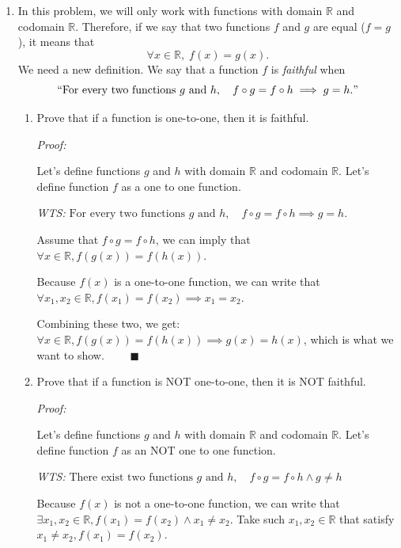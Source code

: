 \documentclass[12pt]{exam}
\newcommand{\vv}{\vspace{.1cm}}
\newcommand{\R}{\mathbb{R}}
\begin{document}
\begin{enumerate}

\item In this problem, we will only work with functions with domain $\mathbb{R}$ and codomain $\R$.   Therefore, if we say that two functions $f$ and $g$ are equal ($f=g$), it means that 
	$$
		\forall x \in \R, \; f(x)  = g(x) .
	$$
We need a new definition.  We say that a function $f$ is \emph{faithful} when
	\begin{equation*}
		``\mbox{For every two functions } g \mbox{ and } h, \quad f \circ g = f \circ h \implies g = h."
	\end{equation*}
	\begin{enumerate}
		\item  Prove that if a function is one-to-one, then it is faithful.
		
{
	\vv

	\emph{Proof:}

	\vv

	Let's define functions $g$ and $h$ with domain $\R$ and codomain $\R$. Let's define function $f$ as a one to one function.

	\emph{WTS:} $\mbox{For every two functions } g \mbox{ and } h, \quad f \circ g = f \circ h \implies g = h.$


	Assume that $f \circ g = f \circ h$, 
	we can imply that $\forall x \in \R, f(g(x)) = f(h(x)) $.

	Because $f(x)$ is a one-to-one function, we can write that $\forall x_1, x_2 \in \R, f(x_1) = f(x_2) \implies x_1 = x_2$.


	Combining these two, we get:
	$\forall x \in \R, f(g(x)) = f(h(x)) \implies g(x) = h(x)$, which is what we want to show. $\qquad \blacksquare$
}
		
\newpage

		\item  Prove that if a function is NOT one-to-one, then it is NOT faithful.
{
	\vv

	\emph{Proof:}

	\vv

	Let's define functions $g$ and $h$ with domain $\R$ and codomain $\R$. Let's define function $f$ as an NOT one to one function.

	\emph{WTS:} $\mbox{There exist two functions } g \mbox{ and } h, \quad f \circ g = f \circ h \land g \neq h$

	Because $f(x)$ is not a one-to-one function, we can write that $\exists x_1, x_2 \in \R, f(x_1) = f(x_2) \land x_1 \neq x_2$.
	Take such $x_1, x_2 \in \R$ that satisfy $x_1 \neq x_2, f(x_1) = f(x_2)$.


}
\end{enumerate}
\end{enumerate}
\end{document}
